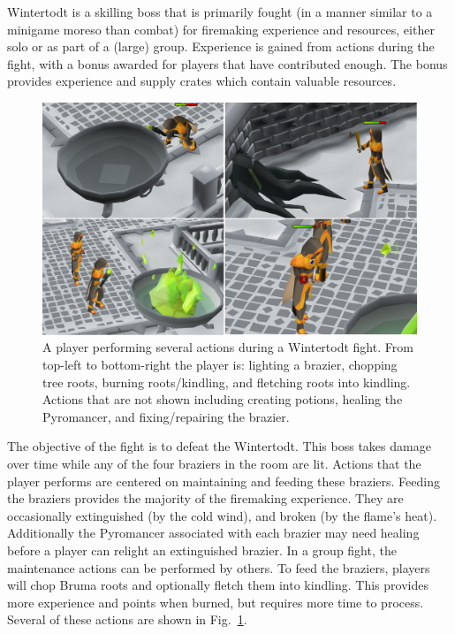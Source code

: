 Wintertodt is a skilling boss that is primarily fought (in a manner similar to a minigame moreso than combat) for firemaking experience and resources, either solo or as part of a (large) group. Experience is gained from actions during the fight, with a bonus awarded for players that have contributed enough. The bonus provides experience and supply crates which contain valuable resources.

\begin{figure}
	\centering
	\includegraphics[width=\linewidth]{img/firemaking/wintertodt_actions.png}
	\caption{
		A player performing several actions during a Wintertodt fight. From top-left to bottom-right the player is: lighting a brazier, chopping tree roots, burning roots/kindling, and fletching roots into kindling. Actions that are not shown including creating potions, healing the Pyromancer, and fixing/repairing the brazier.
	}
	\label{fig:wintertodt_actions}
\end{figure}

The objective of the fight is to defeat the Wintertodt. This boss takes damage over time while any of the four braziers in the room are lit. Actions that the player performs are centered on maintaining and feeding these braziers. Feeding the braziers provides the majority of the firemaking experience. They are occasionally extinguished (by the cold wind), and broken (by the flame's heat). Additionally the Pyromancer associated with each brazier may need healing before a player can relight an extinguished brazier. In a group fight, the maintenance actions can be performed by others. To feed the braziers, players will chop Bruma roots and optionally fletch them into kindling. This provides more experience and points when burned, but requires more time to process. Several of these actions are shown in Fig.~\ref{fig:wintertodt_actions}.

